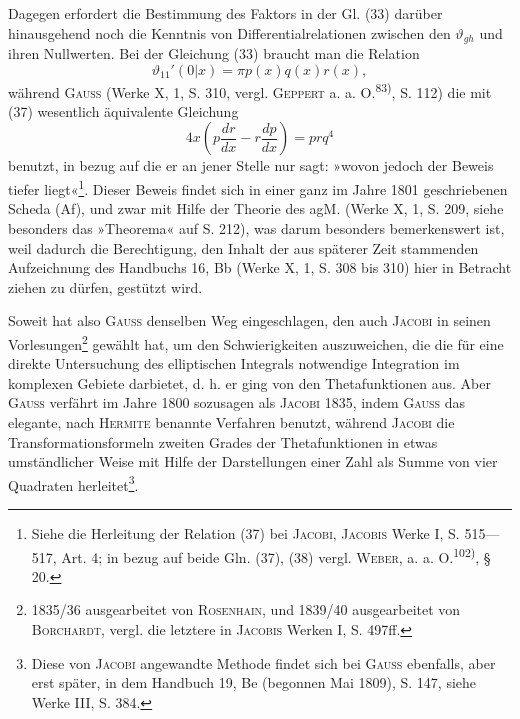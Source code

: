 \clearpage{}
\HistoricalFoot{}{11\textsuperscript{\(\ast\)}}
\indent Dagegen erfordert die Bestimmung des Faktors in der Gl. (33) darüber
hinausgehend noch die Kenntnis von Differentialrelationen zwischen den \(\vartheta_{gh}\)
und ihren Nullwerten. Bei der Gleichung (33) braucht man die Relation
\begingroup\makeatletter\tagsleft@true\let\veqno\leqno\makeatother
\begin{equation*}
\vartheta_{11}'(0|x)=\pi p(x)q(x)r(x),\tag{37}
\end{equation*}
\endgroup
\noindent während \textsc{Gauss} (Werke X, 1, S. 310, vergl. \textsc{Geppert} a. a. O.\textsuperscript{83)}, S. 112) die mit
(37) wesentlich äquivalente Gleichung
\begingroup\makeatletter\tagsleft@true\let\veqno\leqno\makeatother
\begin{equation*}
4x\left(p\frac{dr}{dx}-r\frac{dp}{dx}\right)=prq^4\tag{38}
\end{equation*}
\endgroup
\noindent benutzt, in bezug auf die er an jener Stelle nur sagt: »wovon jedoch der Beweis tiefer liegt«\footnote{Siehe die Herleitung der Relation (37) bei \textsc{Jacobi}, \textsc{Jacobis} Werke I, S. 515—517, Art. 4; in bezug auf beide Gln. (37), (38) vergl. \textsc{Weber}, a. a. O.\textsuperscript{102)}, § 20.}. Dieser Beweis findet sich in einer ganz im Jahre 1801
geschriebenen Scheda (Af), und zwar mit Hilfe der Theorie des agM. (Werke
X, 1, S. 209, siehe besonders das »Theorema« auf S. 212), was darum besonders
bemerkenswert ist, weil dadurch die Berechtigung, den Inhalt der aus späterer
Zeit stammenden Aufzeichnung des Handbuchs 16, Bb (Werke X, 1, S. 308
bis 310) hier in Betracht ziehen zu dürfen, gestützt wird.

Soweit hat also \textsc{Gauss} denselben Weg eingeschlagen, den auch \textsc{Jacobi} in
seinen Vorlesungen\footnote{1835/36 ausgearbeitet von \textsc{Rosenhain}, und 1839/40 ausgearbeitet von \textsc{Borchardt}, vergl. die letztere in \textsc{Jacobis} Werken I, S. 497ff.} gewählt hat, um den Schwierigkeiten auszuweichen, die
die für eine direkte Untersuchung des elliptischen Integrals notwendige Integration im komplexen Gebiete darbietet, d. h. er ging von den Thetafunktionen aus. Aber \textsc{Gauss} verfährt im Jahre 1800 sozusagen  als
\textsc{Jacobi} 1835, indem \textsc{Gauss} das elegante, nach \textsc{Hermite} benannte Verfahren
benutzt, während \textsc{Jacobi} die Transformationsformeln zweiten Grades der Thetafunktionen in etwas umständlicher Weise mit Hilfe der Darstellungen einer
Zahl als Summe von vier Quadraten herleitet\footnote{Diese von \textsc{Jacobi} angewandte Methode findet sich bei \textsc{Gauss} ebenfalls, aber erst später, in dem Handbuch 19, Be (begonnen Mai 1809), S. 147, siehe Werke III, S. 384.}.

